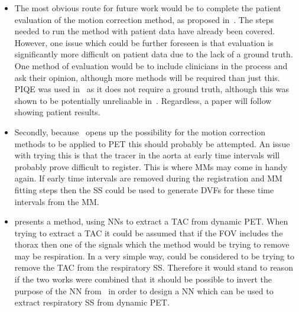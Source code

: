         \begin{itemize}
            \item The most obvious route for future work would be to complete the patient evaluation of the motion correction method, as proposed in~. The steps needed to run the method with patient data have already been covered. However, one issue which could be further foreseen is that evaluation is significantly more difficult on patient data due to the lack of a ground truth. One method of evaluation would be to include clinicians in the process and ask their opinion, although more methods will be required than just this. \gls{PIQE} was used in~ as it does not require a ground truth, although this was shown to be potentially unreliaable in~. Regardless, a paper will follow showing patient results.

            \item Secondly, because~ opens up the possibility for the motion correction methods to be applied to \gls{PET} this should probably be attempted. An issue with trying this is that the tracer in the aorta at early time intervals will probably prove difficult to register. This is where \glspl{MM} may come in handy again. If early time intervals are removed during the registration and \gls{MM} fitting steps then the \gls{SS} could be used to generate \glspl{DVF} for these time intervals from the \gls{MM}.

            \item {} presents a method, using \glspl{NN} to extract a \gls{TAC} from dynamic \gls{PET}. When trying to extract a \gls{TAC} it could be assumed that if the \gls{FOV} includes the thorax then one of the signals which the method would be trying to remove may be respiration. In a very simple way,  could be considered to be trying to remove the \gls{TAC} from the respiratory \gls{SS}. Therefore it would stand to reason if the two works were combined that it should be possible to invert the purpose of the \gls{NN} from~ in order to design a \gls{NN} which can be used to extract respiratory \gls{SS} from dynamic \gls{PET}.


\end{itemize}
